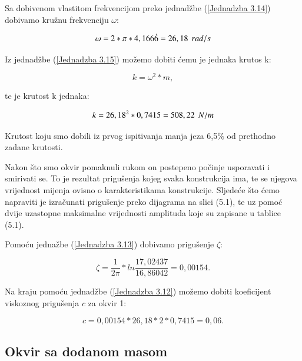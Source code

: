 \documentclass[12pt]{book}
\begin{document}
Sa dobivenom vlastitom frekvencijom preko jednadžbe (\ref{Jednadzba 3.14}) dobivamo kružnu frekvenciju $\omega$:

\begin{equation}\label{Jednadzba 5.6}
	\omega = 2 * \pi * 4,166\dot{6} = 26,18 \hspace{0.15cm} rad/s
\end{equation}

Iz jednadžbe (\ref{Jednadzba 3.15}) možemo dobiti ćemu je jednaka krutos k:

\begin{equation}\label{Jednadzba 5.7}
	k = \omega^2 * m,
\end{equation}

te je krutost k jednaka:

\begin{equation}\label{Jednadzba 5.8}
	k = 26,18^2 * 0,7415 = 508,22 \hspace{0.15cm} N/m
\end{equation}

Krutost koju smo dobili iz prvog ispitivanja manja jeza 6,5$\%$ od prethodno zadane krutosti.

Nakon što smo okvir pomaknuli rukom on postepeno počinje usporavati i smirivati se. To je rezultat prigušenja kojeg svaka konstrukcija ima, te se njegova vrijednost mijenja ovisno o karakteristikama konstrukcije. Sljedeće što ćemo napraviti je izračunati prigušenje preko dijagrama na slici (5.1), te uz pomoć dvije uzastopne maksimalne vrijednosti amplituda koje su zapisane u tablice (5.1).

Pomoću jednažbe (\ref{Jednadzba 3.13}) dobivamo prigušenje $\zeta$:

\begin{equation}\label{Jednadzba 5.9}
	\zeta = \frac{1}{2\pi} * ln\frac{17,02437}{16,86042} = 0,00154.
\end{equation}

Na kraju pomoću jednadžbe (\ref{Jednadzba 3.12}) možemo dobiti koeficijent viskoznog prigušenja $c$ za okvir 1:

\begin{equation}\label{Jednadzba 5.10}
	c = 0,00154 * 26,18 * 2 * 0,7415 = 0,06.
\end{equation}

\newpage

\subsection{Okvir sa dodanom masom}
\end{document}
